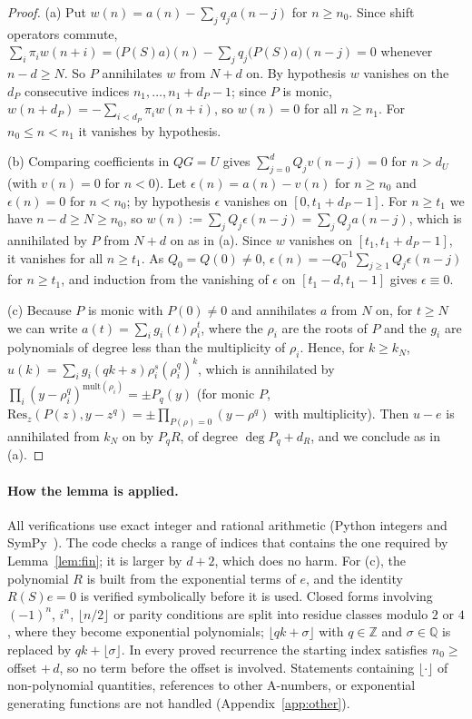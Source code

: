 \documentclass[11pt]{article}
\theoremstyle{definition}
\theoremstyle{remark}
\begin{document}
\begin{proof}
(a) Put $w(n)=a(n)-\sum_jq_ja(n-j)$ for $n\ge n_0$. Since shift operators commute, $\sum_i\pi_iw(n+i)=\bigl(P(S)a\bigr)(n)-\sum_jq_j\bigl(P(S)a\bigr)(n-j)=0$ whenever $n-d\ge N$. So $P$ annihilates $w$ from $N+d$ on. By hypothesis $w$ vanishes on the $d_P$ consecutive indices $n_1,\dots,n_1+d_P-1$; since $P$ is monic, $w(n+d_P)=-\sum_{i<d_P}\pi_iw(n+i)$, so $w(n)=0$ for all $n\ge n_1$. For $n_0\le n<n_1$ it vanishes by hypothesis.

(b) Comparing coefficients in $QG=U$ gives $\sum_{j=0}^dQ_jv(n-j)=0$ for $n>d_U$ (with $v(n)=0$ for $n<0$). Let $\epsilon(n)=a(n)-v(n)$ for $n\ge n_0$ and $\epsilon(n)=0$ for $n<n_0$; by hypothesis $\epsilon$ vanishes on $[0,t_1+d_P-1]$. For $n\ge t_1$ we have $n-d\ge N\ge n_0$, so $w(n):=\sum_jQ_j\epsilon(n-j)=\sum_jQ_ja(n-j)$, which is annihilated by $P$ from $N+d$ on as in (a). Since $w$ vanishes on $[t_1,t_1+d_P-1]$, it vanishes for all $n\ge t_1$. As $Q_0=Q(0)\ne0$, $\epsilon(n)=-Q_0^{-1}\sum_{j\ge1}Q_j\epsilon(n-j)$ for $n\ge t_1$, and induction from the vanishing of $\epsilon$ on $[t_1-d,t_1-1]$ gives $\epsilon\equiv0$.

(c) Because $P$ is monic with $P(0)\ne0$ and annihilates $a$ from $N$ on, for $t\ge N$ we can write $a(t)=\sum_i g_i(t)\rho_i^t$, where the $\rho_i$ are the roots of $P$ and the $g_i$ are polynomials of degree less than the multiplicity of $\rho_i$. Hence, for $k\ge k_N$, $u(k)=\sum_ig_i(qk+s)\rho_i^s(\rho_i^q)^k$, which is annihilated by $\prod_i(y-\rho_i^q)^{\mathrm{mult}(\rho_i)}=\pm P_q(y)$ (for monic $P$, $\mathrm{Res}_z(P(z),y-z^q)=\pm\prod_{P(\rho)=0}(y-\rho^q)$ with multiplicity). Then $u-e$ is annihilated from $k_N$ on by $P_qR$, of degree $\deg P_q+d_R$, and we conclude as in (a).
\end{proof}

\paragraph{How the lemma is applied.} All verifications use exact integer and rational arithmetic (Python integers and SymPy~\cite{sympy}). The code checks a range of indices that contains the one required by Lemma~\ref{lem:fin}; it is larger by $d+2$, which does no harm. For (c), the polynomial $R$ is built from the exponential terms of $e$, and the identity $R(S)e=0$ is verified symbolically before it is used. Closed forms involving $(-1)^n$, $i^n$, $\lfloor n/2\rfloor$ or parity conditions are split into residue classes modulo $2$ or $4$, where they become exponential polynomials; $\lfloor qk+\sigma\rfloor$ with $q\in\mathbb Z$ and $\sigma\in\mathbb Q$ is replaced by $qk+\lfloor\sigma\rfloor$. In every proved recurrence the starting index satisfies $n_0\ge$ offset $+\,d$, so no term before the offset is involved. Statements containing $\lfloor\cdot\rfloor$ of non-polynomial quantities, references to other A-numbers, or exponential generating functions are not handled (Appendix~\ref{app:other}).
\end{document}
